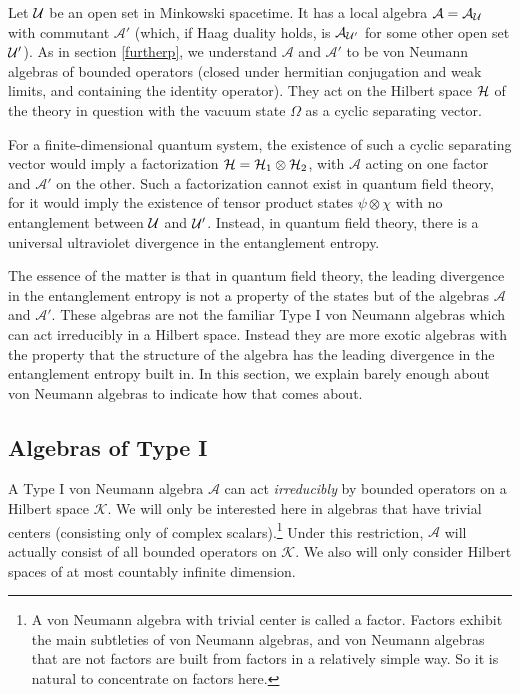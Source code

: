 \documentclass[12pt]{article}
\def\K{{\mathcal K}}
\numberwithin{equation}{section}
\def\A{{\mathcal A}}
\begin{document}
Let ${\mathcal U}$ be an open set in Minkowski spacetime.  It has a local algebra $\A=\A_\U$  with commutant $\A'$ (which, if Haag duality holds,
is  $\A_{\U'}$ for some other open set ${\mathcal U}'$).  
  As in section \ref{furtherp}, we understand
$\A$ and $\A'$ to be von Neumann algebras of bounded operators (closed under hermitian conjugation and weak limits, and containing
the identity operator).  
They act on the Hilbert space ${\mathcal H}$ of the theory in question with
the vacuum state $\Omega$ as a cyclic separating vector.

For a finite-dimensional quantum system, the existence of such a cyclic separating vector would imply a factorization ${\mathcal H}={\mathcal H}_1\otimes{\mathcal H}_2$,
with $\A$ acting on one factor and $\A'$ on the other.
Such a factorization cannot exist in quantum field theory, for it would imply the existence of tensor product states $\psi\otimes\chi$ with
no entanglement between ${\mathcal U}$ and ${\mathcal U}'$.   Instead, in quantum field theory, there is a universal ultraviolet divergence in the entanglement
entropy.

The essence of the matter is that in quantum field theory, the leading divergence in the entanglement entropy is not a property of the states
but of the algebras $\A$ and $\A'$.  These algebras are not the familiar Type I von Neumann algebras which can act irreducibly in
a Hilbert space.  Instead they are more exotic algebras with the property that the structure of the algebra has the  leading
divergence in the entanglement entropy built in.  In this section, we explain barely enough about von Neumann algebras
to indicate how that comes about.




    

\subsection{Algebras of Type I}\label{type1}

A Type I von Neumann algebra  $\A$ can  act {\it irreducibly} by bounded operators on a Hilbert space $\K$.
We will only be interested  here in algebras that have trivial centers (consisting only of complex scalars).\footnote{A von Neumann algebra with trivial
center is called a factor.  Factors exhibit the main subtleties of von Neumann algebras, and von Neumann algebras that are not factors
are built from factors in a relatively simple way.  So it is natural to concentrate on factors here.}  Under
this restriction, $\A$ will actually consist of all bounded operators on $\K$.   We also will only consider Hilbert spaces of at most countably
infinite dimension.
\end{document}
